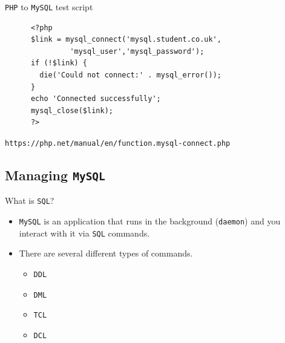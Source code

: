 \documentclass[xcolor=table]{beamer}
\begin{document}
\begin{frame}[fragile]{\texttt{PHP} to \texttt{MySQL} test script}
  \begin{tcolorbox}
    \lstset{
      basicstyle=\tiny\ttfamily,
    }
    \begin{lstlisting}
      <?php
      $link = mysql_connect('mysql.student.co.uk',
               'mysql_user','mysql_password');
      if (!$link) {
        die('Could not connect:' . mysql_error());
      }
      echo 'Connected successfully';
      mysql_close($link);
      ?>
    \end{lstlisting}
  \end{tcolorbox}
  \begin{tcolorbox}
    \small\texttt{https://php.net/manual/en/function.mysql-connect.php}
  \end{tcolorbox}
\end{frame}

\subsection{Managing \texttt{MySQL}}
\begin{frame}{What is \texttt{SQL}?}
  \begin{itemize}
    \item \texttt{MySQL} is an application that runs in the background (\texttt{daemon}) and you interact with it via \texttt{SQL} commands.
    \item There are several different types of commands.
      \begin{itemize}
        \item \texttt{DDL}
        \item \texttt{DML}
        \item \texttt{TCL}
        \item \texttt{DCL}
      \end{itemize}
  \end{itemize}
\end{frame}
\end{document}
